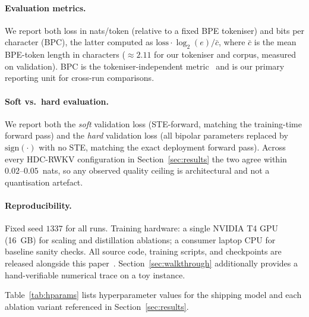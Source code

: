 \documentclass[runningheads]{llncs}
\begin{document}
\paragraph{Evaluation metrics.}
We report both loss in nats/token (relative to a fixed BPE tokeniser)
and bits per character (BPC), the latter computed as
$\text{loss} \cdot \log_2(e) / \bar{c}$, where $\bar{c}$ is the mean
BPE-token length in characters (${\approx}2.11$ for our tokeniser and
corpus, measured on validation). BPC is the tokeniser-independent
metric~\cite{peng2023rwkv} and is our primary reporting unit for
cross-run comparisons.

\paragraph{Soft vs.\ hard evaluation.}
We report both the \emph{soft} validation loss (STE-forward, matching
the training-time forward pass) and the \emph{hard} validation loss
(all bipolar parameters replaced by $\mathrm{sign}(\cdot)$ with no
STE, matching the exact deployment forward pass). Across every
HDC-RWKV configuration in Section~\ref{sec:results} the two agree
within $0.02$--$0.05$~nats, so any observed quality ceiling is
architectural and not a quantisation artefact.

\paragraph{Reproducibility.}
Fixed seed $1337$ for all runs. Training hardware: a single NVIDIA T4
GPU (16~GB) for scaling and distillation ablations; a consumer laptop
CPU for baseline sanity checks. All source code, training scripts, and
checkpoints are released alongside this paper~\cite{wozformer2026}.
Section~\ref{sec:walkthrough} additionally provides a hand-verifiable
numerical trace on a toy instance.

Table~\ref{tab:hparams} lists hyperparameter values for the shipping
model and each ablation variant referenced in Section~\ref{sec:results}.
\end{document}

